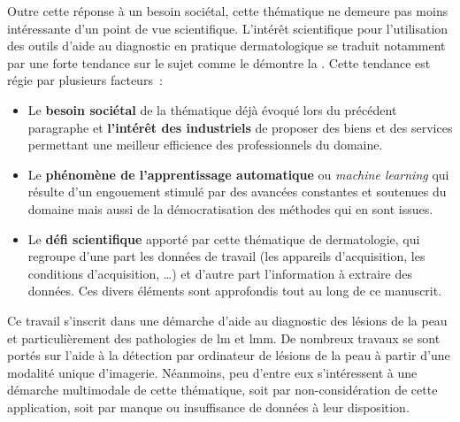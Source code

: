 Outre cette réponse à un besoin sociétal, cette thématique ne demeure pas moins intéressante d’un point de vue scientifique. L’intérêt scientifique pour l'utilisation des outils d'aide au diagnostic en pratique dermatologique se traduit notamment par une forte tendance sur le sujet comme le démontre la . Cette tendance est régie par plusieurs facteurs~:
\begin{itemize}
    \item Le \textbf{besoin sociétal} de la thématique déjà évoqué lors du précédent paragraphe et \textbf{l'intérêt des industriels} de proposer des biens et des services permettant une meilleur efficience des professionnels du domaine.
    \item Le \textbf{phénomène de l'apprentissage automatique} ou \textit{machine learning} qui résulte d'un engouement stimulé par des avancées constantes et soutenues du domaine mais aussi de la démocratisation des méthodes qui en sont issues. 
    \item Le \textbf{défi scientifique} apporté par cette thématique de dermatologie, qui regroupe d'une part les données de travail (les appareils d'acquisition, les conditions d'acquisition, \ldots) et d'autre part l'information à extraire des données. Ces divers éléments sont approfondis tout au long de ce manuscrit.
\end{itemize}\par
\clearpage

Ce travail s'inscrit dans une démarche d'aide au diagnostic des lésions de la peau et particulièrement des pathologies de \gls{lm} et \gls{lmm}. De nombreux travaux se sont portés sur l'aide à la détection par ordinateur de lésions de la peau à partir d'une modalité unique d'imagerie. Néanmoins, peu d'entre eux s'intéressent à une démarche multimodale de cette thématique, soit par non-considération de cette application, soit par manque ou insuffisance de données à leur disposition.\par

